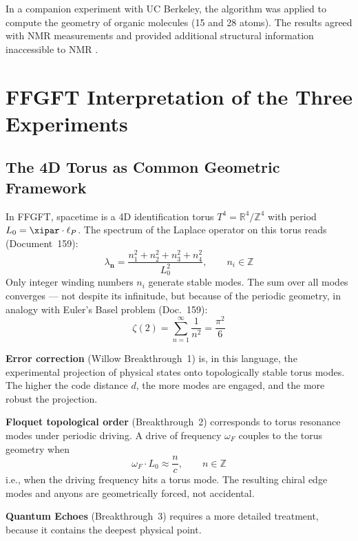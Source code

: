 In a companion experiment with UC Berkeley, the algorithm was applied to compute the
geometry of organic molecules (15 and 28 atoms). The results agreed with NMR
measurements and provided additional structural information inaccessible to NMR
\cite{GoogleEchoes2025}.


\section{FFGFT Interpretation of the Three Experiments}

\subsection{The 4D Torus as Common Geometric Framework}

In FFGFT, spacetime is a 4D identification torus
$T^4 = \mathbb{R}^4/\mathbb{Z}^4$ with period $L_0 = \xipar \cdot \ell_P$.
The spectrum of the Laplace operator on this torus reads (Document~159):
\begin{equation}
    \lambda_{\mathbf{n}} = \frac{n_1^2 + n_2^2 + n_3^2 + n_4^2}{L_0^2},
    \qquad n_i \in \mathbb{Z}
\end{equation}
Only integer winding numbers $n_i$ generate stable modes. The sum over all modes
converges — not despite its infinitude, but because of the periodic geometry, in
analogy with Euler's Basel problem (Doc.~159):
\begin{equation}
    \zeta(2) = \sum_{n=1}^{\infty} \frac{1}{n^2} = \frac{\pi^2}{6}
\end{equation}

\textbf{Error correction} (Willow Breakthrough~1) is, in this language, the
experimental projection of physical states onto topologically stable torus modes.
The higher the code distance $d$, the more modes are engaged, and the more robust
the projection.

\textbf{Floquet topological order} (Breakthrough~2) corresponds to torus resonance
modes under periodic driving. A drive of frequency $\omega_F$ couples to the torus
geometry when
\begin{equation}
    \omega_F \cdot L_0 \approx \frac{n}{c}, \qquad n \in \mathbb{Z}
\end{equation}
i.e., when the driving frequency hits a torus mode. The resulting chiral edge modes
and anyons are geometrically forced, not accidental.

\textbf{Quantum Echoes} (Breakthrough~3) requires a more detailed treatment,
because it contains the deepest physical point.

